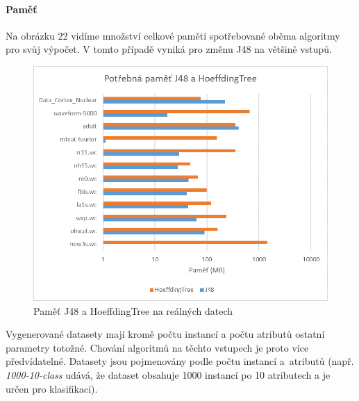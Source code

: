 \documentclass[12pt]{article}
\begin{document}
\paragraph{Paměť}
Na obrázku 22 vidíme množství celkové paměti spotřebované oběma algoritmy pro svůj výpočet. V tomto případě vyniká pro změnu J48 na většině vstupů.
\begin{figure}[hbp]
  \centering
  \includegraphics[scale=1]{img/realclassmem.png}
  \caption{Paměť J48 a HoeffdingTree na reálných datech}
\end{figure}

\newpage
{}
Vygenerované datasety mají kromě počtu instancí a počtu atributů ostatní parametry totožné. Chování algoritmů na těchto vstupech je proto více předvídatelné. Datasety jsou pojmenovány podle počtu instancí a~atributů (např. \textit{1000-10-class} udává, že dataset obsahuje 1000 instancí po 10 atributech a je určen pro klasifikaci).
\end{document}
